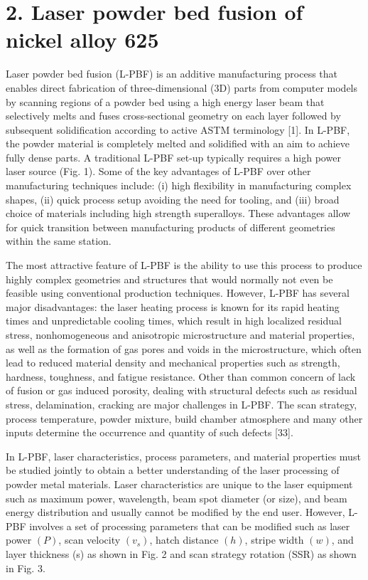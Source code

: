 \documentclass[10pt]{article}
\begin{document}
\section*{2. Laser powder bed fusion of nickel alloy 625}
Laser powder bed fusion (L-PBF) is an additive manufacturing process that enables direct fabrication of three-dimensional (3D) parts from computer models by scanning regions of a powder bed using a high energy laser beam that selectively melts and fuses cross-sectional geometry on each layer followed by subsequent solidification according to active ASTM terminology [1]. In L-PBF, the powder material is completely melted and solidified with an aim to achieve fully dense parts. A traditional L-PBF set-up typically requires a high power laser source (Fig. 1). Some of the key advantages of L-PBF over other manufacturing techniques include: (i) high flexibility in manufacturing complex shapes, (ii) quick process setup avoiding the need for tooling, and (iii) broad choice of materials including high strength superalloys. These advantages allow for quick transition between manufacturing products of different geometries within the same station.

The most attractive feature of L-PBF is the ability to use this process to produce highly complex geometries and structures that would normally not even be feasible using conventional production techniques. However, L-PBF has several major disadvantages: the laser heating process is known for its rapid heating times and unpredictable cooling times, which result in high localized residual stress, nonhomogeneous and anisotropic microstructure and material properties, as well as the formation of gas pores and voids in the microstructure, which often lead to reduced material density and mechanical properties such as strength, hardness, toughness, and fatigue resistance. Other than common concern of lack of fusion or gas induced porosity, dealing with structural defects such as residual stress, delamination, cracking are major challenges in L-PBF. The scan strategy, process temperature, powder mixture, build chamber atmosphere and many other inputs determine the occurrence and quantity of such defects [33].

In L-PBF, laser characteristics, process parameters, and material properties must be studied jointly to obtain a better understanding of the laser processing of powder metal materials. Laser characteristics are unique to the laser equipment such as maximum power, wavelength, beam spot diameter (or size), and beam energy distribution and usually cannot be modified by the end user. However, L-PBF involves a set of processing parameters that can be modified such as laser power $(P)$, scan velocity $\left(v_{s}\right)$, hatch distance $(h)$, stripe width $(w)$, and layer thickness (s) as shown in Fig. 2 and scan strategy rotation (SSR) as shown in Fig. 3.
\end{document}
